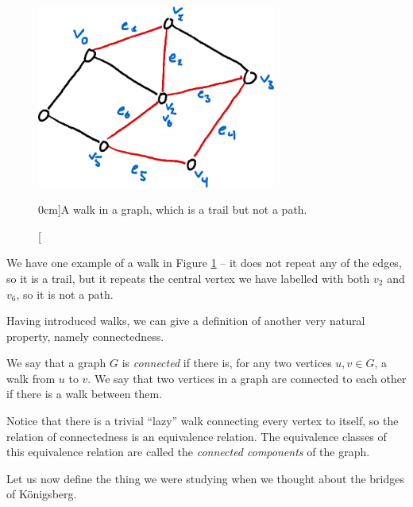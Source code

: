 \documentclass[nobib]{tufte-handout}
\begin{document}
\begin{figure}
    \centering
    \includegraphics[width=0.7\textwidth]{graphics/L2_eulerianity_subgraphs/walk_in_graph.png}
    \caption[][0cm]{A walk in a graph, which is a trail but not a path.}
    \label{fig:walk_in_graph}
\end{figure}

We have one example of a walk in Figure \ref{fig:walk_in_graph} -- it does not repeat any of the edges, so it is a trail, but it repeats the central vertex we have labelled with both $v_2$ and $v_6$, so it is not a path.

Having introduced walks, we can give a definition of another very natural property, namely connectedness.

\begin{definition}
  We say that a graph $G$ is \emph{connected} if there is, for any two vertices $u, v \in G$, a walk from $u$ to $v$. We say that two vertices in a graph are connected to each other if there is a walk between them.

  Notice that there is a trivial ``lazy'' walk connecting every vertex to itself, so the relation of connectedness is an equivalence relation. The equivalence classes of this equivalence relation are called the \emph{connected components} of the graph.
\end{definition}

Let us now define the thing we were studying when we thought about the bridges of Königsberg.
\end{document}
